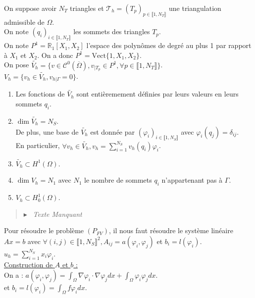\documentclass[12pt,a4paper]{article}
\newcommand{\propriete}[2]{%
    \begin{tcolorbox}[colback=white,colframe=green!25!white,title=\textbf{Propriété #1}, coltitle=black]
        #2
    \end{tcolorbox}
}
\newcommand{\remarque}[1]{%
    \leftline{\noindent
    \textcolor{customRed}{\vrule width 3pt}\hspace{10pt}%
    \parbox{0.9\textwidth}{%
        \textbf{Remarque :}
        #1
    }}
    \vspace{10pt}
}
\newcommand{\preuve}[1]{%
    \begin{quote}
        $\blacktriangleright$~#1
    \end{quote}
}
\begin{document}
On suppose avoir $N_T$ triangles et $\mathcal{T}_h = (T_p)_{p \in \llbracket 1, N_T \rrbracket}$ une triangulation admissible de $\Omega$. \\
On note $(q_i)_{i \in \llbracket 1, N_T \rrbracket}$ les sommets des triangles $T_p$. \\
On note $P^1 = \mathbb{R}_1[X_1, X_2]$ l'espace des polynômes de degré au plus 1 par rapport à $X_1$ et $X_2$.
On a donc $P^1 = \text{Vect}\{1, X_1, X_2\}$. \\

On pose $\tilde{V_h} = \{v \in \mathcal{C}^0(\overline{\Omega}), v_{|T_p} \in P^1, \forall p \in \llbracket 1, N_T \rrbracket\}$. \\
$V_h = \{v_h \in \tilde{V_h}, v_{h | \Gamma} = 0\}$. \\


\propriete{}{
    \begin{enumerate}[label=\roman*)]
        \item Les fonctions de $\tilde{V_h}$ sont entièremement définies par leurs valeurs en leurs sommets $q_i$.
        \item $\dim \tilde{V_h} = N_S$. \\
        De plus, une base de $\tilde{V_h}$ est donnée par $(\varphi_i)_{i \in \llbracket 1, N_S \rrbracket}$ avec $\varphi_i(q_j) = \delta_{ij}$. \\
        En particulier, $\forall v_h \in \tilde{V_h}, v_h = \sum_{i=1}^{N_S} v_h(q_i) \varphi_i$.
        \item $\tilde{V_h} \subset H^1(\Omega)$.
        \item $\dim V_h = N_1$ avec $N_1$ le nombre de sommets $q_i$ n'appartenant pas à $\Gamma$.
        \item $V_h \subset H^1_0(\Omega)$.
    \end{enumerate}
}

\remarque{
    shema
}


\preuve{
    \textit{Texte Manquant}
}


Pour résoudre le problème $(P_{FV})$, il nous faut résoudre le système linéaire $Ax = b$ avec $\forall (i, j) \in \llbracket 1, N_S \rrbracket^2, A_{ij} = a(\varphi_i, \varphi_j)$ et $b_i = l(\varphi_i)$. $u_h = \sum_{i=1}^{N_S} x_i \varphi_i$. \\


\underline{Construction de $A$ et $b$ :} \\
On a : $a(\varphi_i, \varphi_j) = \int_{\Omega} \nabla \varphi_i \cdot \nabla \varphi_j dx + \int_{\Omega} \varphi_i \varphi_j dx$. \\
et $b_i = l(\varphi_i) = \int_{\Omega} f \varphi_i dx$. \\
\end{document}
